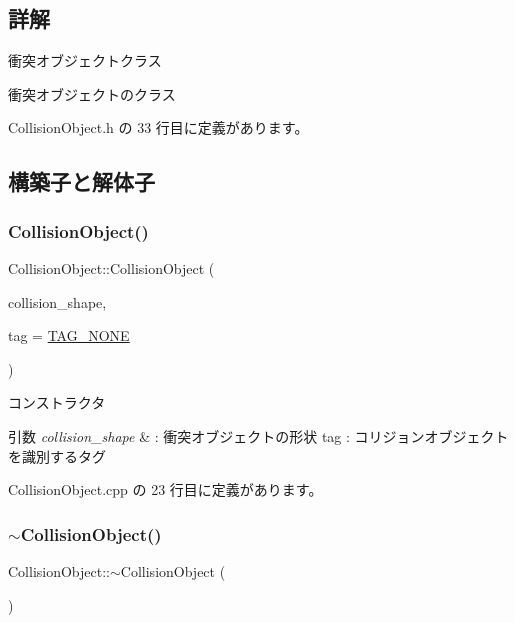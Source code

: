 \subsection{詳解}
衝突オブジェクトクラス 

衝突オブジェクトのクラス 

 Collision\+Object.\+h の 33 行目に定義があります。



\subsection{構築子と解体子}
\mbox{\label{class_collision_object_a6f502c16aaae1dc1470107a930f28808}} 
\subsubsection{\texorpdfstring{Collision\+Object()}{CollisionObject()}}
{\footnotesize\ttfamily Collision\+Object\+::\+Collision\+Object (\begin{DoxyParamCaption}\item[{\mbox{\hyperlink{class_collision_shape_base}{Collision\+Shape\+Base}} $\ast$}]{collision\+\_\+shape,  }\item[{int}]{tag = {\ttfamily \mbox{\hyperlink{class_collision_object_a22badef1e6fc9c2b1f002bd99ede049f}{T\+A\+G\+\_\+\+N\+O\+NE}}} }\end{DoxyParamCaption})}



コンストラクタ 


\begin{DoxyParams}{引数}
{\em collision\+\_\+shape} & \+: 衝突オブジェクトの形状 tag \+: コリジョンオブジェクトを識別するタグ \\
\hline
\end{DoxyParams}


 Collision\+Object.\+cpp の 23 行目に定義があります。

\mbox{\label{class_collision_object_a8c4e6916bc5911b8a82498536d5a27e1}} 
\subsubsection{\texorpdfstring{$\sim$\+Collision\+Object()}{~CollisionObject()}}
{\footnotesize\ttfamily Collision\+Object\+::$\sim$\+Collision\+Object (\begin{DoxyParamCaption}{ }\end{DoxyParamCaption})}



